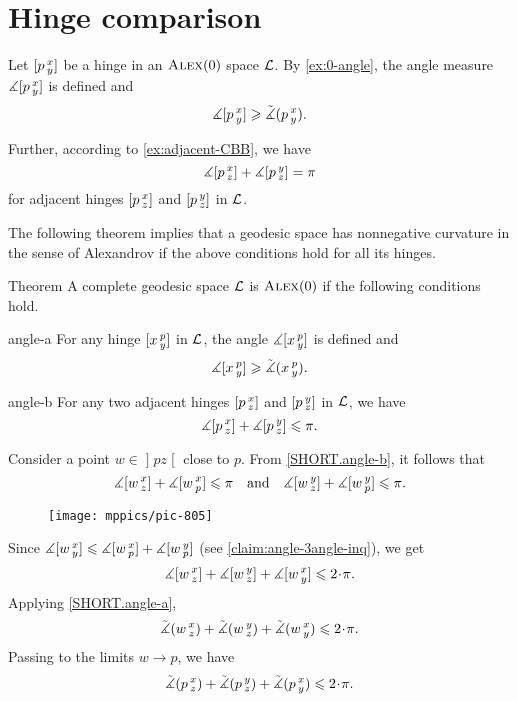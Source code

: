 
\section{Hinge comparison}

Let $[p\,{}^{x}_{y}]$ be a hinge in an $\textsc{Alex}(0)$ space $\mathcal{L}$.
By \ref{ex:0-angle}, the angle measure $\measuredangle[p\,{}^{x}_{y}]$ is defined and
\[\measuredangle[p\,{}^{x}_{y}]\geqslant \tilde\measuredangle(p\,{}^{x}_{y}).\]

Further, according to \ref{ex:adjacent-CBB}, we have 
\[\measuredangle[p\,{}^{x}_{z}]+\measuredangle[p\,{}^{y}_{z}]=\pi\]
for adjacent hinges $[p\,{}^{x}_{z}]$ and $[p\,{}^{y}_{z}]$ in $\mathcal{L}$.

The following theorem implies that a geodesic space has nonnegative curvature in the sense of Alexandrov if
the above conditions hold for all its hinges.

\begin{thm}{Theorem}\label{thm:angle-cbb}
A complete geodesic space $\mathcal{L}$ is $\textsc{Alex}(0)$ if the following conditions hold.

\begin{subthm}{angle-a}
For any hinge $[x\,{}^{p}_{y}]$ in $\mathcal{L}$, the angle 
$\measuredangle[x\,{}^{p}_{y}]$ is defined and 
\[\measuredangle[x\,{}^{p}_{y}]\geqslant\tilde\measuredangle(x\,{}^{p}_{y}).\]
\end{subthm}

\begin{subthm}{angle-b}
For any two adjacent hinges $[p\,{}^{x}_{z}]$ and $[p\,{}^{y}_{z}]$ in $\mathcal{L}$, we have
\[\measuredangle[p\,{}^{x}_{z}]+\measuredangle[p\,{}^{y}_{z}]\leqslant\pi.\]
\end{subthm}

\end{thm}

Consider a point  $w\in \mathopen{]} p z \mathclose{[}$ close to $p$.
From \ref{SHORT.angle-b}, it follows that 
\[\measuredangle[w\,{}^{x}_{z}]+ \measuredangle[w\,{}^{x}_{p}]\leqslant\pi\quad \text{and}\quad \measuredangle[w\,{}^{y}_{z}] + \measuredangle[w\,{}^{y}_{p}]\leqslant\pi.\]

\begin{wrapfigure}{o}{30 mm}
\vskip-4mm
\centering
\texttt{[image: mppics/pic-805]}
\vskip4mm
\end{wrapfigure}

Since $\measuredangle[w\,{}^{x}_{y}]\leqslant \measuredangle[w\,{}^{x}_{p}] +\measuredangle[w\,{}^{y}_{p}]$ (see \ref{claim:angle-3angle-inq}), we get 
\[\mangle\hinge w x z+ \mangle\hinge w y z +\mangle\hinge w x y
\le
2\cdot\pi.\]
Applying \ref{SHORT.angle-a}, 
\[\angk w x z
+ \angk w y z 
+\angk w x y
\le
2\cdot\pi.\]
Passing to the limits $w\to p$, we have
\[\angk p x z 
+ \angk p y z 
+\angk p x y
\le
2\cdot\pi.\]
\qedsf

